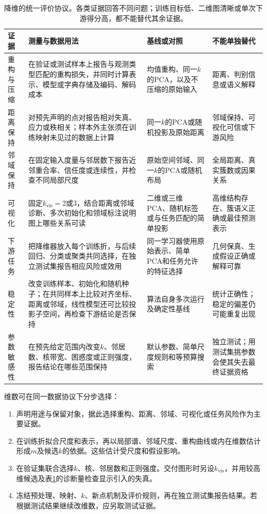 \begin{table}[!htbp]
  \centering
  \small
  \begin{tabularx}{\linewidth}{@{}>{\RaggedRight\arraybackslash}p{23mm}>{\RaggedRight\arraybackslash}p{58mm}>{\RaggedRight\arraybackslash}X>{\RaggedRight\arraybackslash}X@{}}
    \toprule
    证据 & 测量与数据用法 & 基线或对照 & 不能单独替代 \\
    \midrule
    重构与压缩
      & 在验证或测试样本上报告与观测类型匹配的重构损失，并同时计算表示、模型或字典存储及编码、解码成本
      & 均值重构、同一$k$的PCA，以及不压缩的原始输入
      & 距离、判别信息或语义解释 \\
    距离保持
      & 对预先声明的点对报告相对失真、应力或秩相关；样本外主张须在训练映射未见过的数据上计算
      & 同一$k$的PCA或随机投影及原始距离
      & 邻域保持、可视化可信或下游风险 \\
    邻域保持
      & 在固定输入度量与邻居数下报告近邻重合率、信任度或连续性，并检查不同局部尺度
      & 原始空间邻域、同一$k$的PCA或随机布局
      & 全局距离、真实簇数或因果关系 \\
    可视化
      & 固定$k_{\mathrm{vis}}=2$或$3$，结合距离或邻域诊断、多次初始化和领域标注说明图上哪些关系可读
      & 二维或三维PCA、随机标签或与任务匹配的简单投影
      & 高维结构存在、簇语义正确或最佳预测表示 \\
    下游任务
      & 把降维器放入每个训练折，与后续回归、分类或聚类共同选择，在独立测试集报告相应风险或效用
      & 同一学习器使用原始表示、简单PCA和任务允许的特征选择
      & 几何保真、生成假设正确或解释可靠 \\
    稳定性
      & 改变训练样本、初始化和随机种子；在共同样本上比较对齐坐标、距离或邻域，线性模型还可比较投影子空间，再检查下游结论是否保持
      & 算法自身多次运行及确定性基线
      & 统计正确性；稳定的偏差仍可能重复出现 \\
    参数敏感性
      & 在预先给定范围内改变$k$、邻居数、核带宽、困惑度或正则强度，报告结论在哪些范围保持
      & 默认参数、简单尺度规则和等预算搜索
      & 独立测试；用测试集挑参数会使其失去最终证据资格 \\
    \bottomrule
  \end{tabularx}
  \caption{降维的统一评价协议。各类证据回答不同问题；训练目标低、二维图清晰或单次下游得分高，都不能替代其余证据。}
  \label{tab:dim-evaluation-protocol}
\end{table}

维数可在同一数据协议下分步选择：
\begin{enumerate}
  \item 声明用途与保留对象，据此选择重构、距离、邻域、可视化或任务风险作为主要证据。
  \item 在训练折拟合尺度和表示，再以局部谱、邻域尺度、重构曲线或内在维数估计形成$m$及候选$k$的依据。这些估计受尺度和假设影响。
  \item 在验证集联合选择$k$、核、邻居数和正则强度。交付图形时另设$k_{\mathrm{vis}}$，并用较高维候选及表\ref{tab:dim-evaluation-protocol}的诊断量检查显示引入的失真。
  \item 冻结预处理、映射、$k$、新点机制及评价规则，再在独立测试集报告结果。若根据测试结果继续改维数，应另取测试证据。
\end{enumerate}

